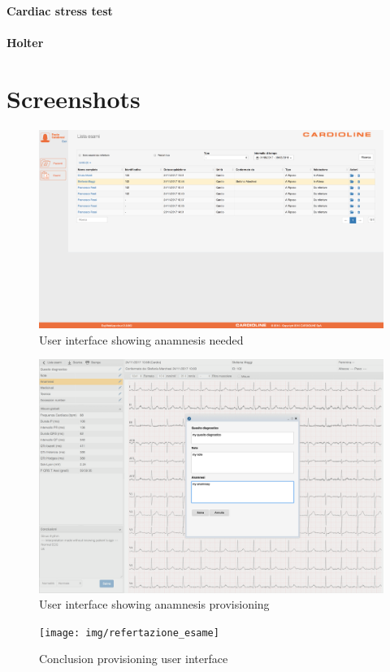 \paragraph{Cardiac stress test}
\label{paragraph:Cardiac stress test}
\paragraph{Holter}
\label{paragraph:Holter}

\section{Screenshots}
\begin{figure}[h]
    \includegraphics[width=\textwidth]{img/todo_anamnesi}
    \caption{User interface showing anamnesis needed}
    \label{fig:todo_anamnesi}
\end{figure}

\begin{figure}[h]
    \includegraphics[width=\textwidth]{img/aggiunta_anamnesi}
    \caption{User interface showing anamnesis provisioning}
    \label{fig:aggiunta_anamnesi}
\end{figure}

\begin{figure}[h]
    \texttt{[image: img/refertazione\_esame]}
    \caption{Conclusion provisioning user interface}
    \label{fig:refertazione_esame}
\end{figure}



